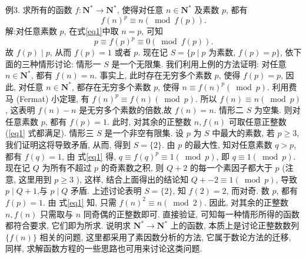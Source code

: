 例3. 求所有的函数 $f: \mathbf{N}^* \rightarrow \mathbf{N}^*$, 使得对任意 $n \in \mathbf{N}^*$ 及素数 $p$, 都有
$$
f(n)^p \equiv n(\bmod f(p)) . \label{eq1}
$$
解:对任意素数 $p$, 在式\ref{eq1}中取 $n=p$, 可知
$$
p \equiv f(p)^p \equiv 0(\bmod f(p)) .
$$
故 $f(p) \mid p$, 从而 $f(p)=1$ 或者 $p$.
现在记 $S=\{p \mid p$ 为素数, $f(p)=p\}$, 依下面的三种情形讨论:
情形一 $S$ 是一个无限集.
我们利用上例的方法证明: 对任意 $n \in \mathbf{N}^*$, 都有 $f(n)=n$.
事实上, 此时存在无穷多个素数 $p$, 使得 $f(p)=p$, 因此, 对任意 $n \in \mathbf{N}^*$, 都存在无穷多个素数 $p$, 使得 $n \equiv f(n)^p(\bmod p)$. 利用费马 (Fermat) 小定理, 有 $f(n)^p \equiv f(n)(\bmod p)$. 所以 $f(n) \equiv n(\bmod p)$, 这表明 $f(n)-n$ 是无穷多个素数的倍数,故 $f(n)=n$.
情形二 $S$ 为空集.
则对任意素数 $p$, 都有 $f(p)=1$. 此时, 对其余的正整数 $n, f(n)$ 可取任意正整数 (\ref{eq1} 式都满足).
情形三 $S$ 是一个非空有限集.
设 $p$ 为 $S$ 中最大的素数, 若 $p \geqslant 3$, 我们证明这将导致矛盾, 从而, 得到 $S=\{2\}$.
由 $p$ 的最大性, 知对任意素数 $q>p$, 都有 $f(q)=1$, 由 式\ref{eq1} 得, $q \equiv f(q)^p \equiv 1(\bmod p)$, 即 $q \equiv 1(\bmod p)$.
现在记 $Q$ 为所有不超过 $p$ 的奇素数之积, 则 $Q+2$ 的每一个素因子都大于 $p$ (注意, 这里用到 $p \geqslant 3$ ), 这样, 结合上面得出的结论知 $Q+-2 \equiv 1(\bmod p)$, 导致 $p \mid Q+1$,与 $p \mid Q$ 矛盾.
上述讨论表明 $S=\{2\}$, 知 $f(2)=2$, 而对奇.
数 $p$, 都有 $f(p)=1$. 由 式\ref{eq1} 知, 只需 $f(n)^2 \equiv n(\bmod 2)$. 因此, 对其余的正整数 $n, f(n)$ 只需取与 $n$ 同奇偶的正整数即可.
直接验证, 可知每一种情形所得的函数都符合要求, 它们即为所求.
说明求 $\mathbf{N}^* \rightarrow \mathbf{N}^*$ 上的函数, 本质上是讨论正整数数列 $\{f(n)\}$ 相关的问题, 这里都采用了素因数分析的方法, 它属于数论方法的迁移, 同样, 求解函数方程的一些思路也可用来讨论这类问题.



